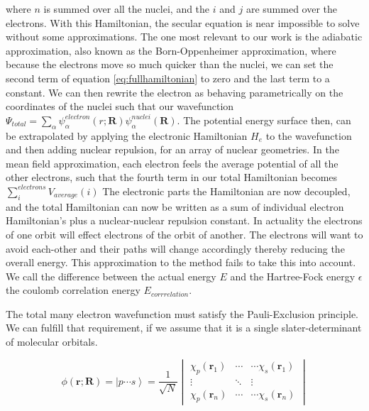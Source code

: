     where $n$ is summed over all the nuclei, and the $i$ and $j$ are summed over the electrons. 
    With this Hamiltonian, the secular equation is near impossible to solve without some approximations.
    The one most relevant to our work is the adiabatic approximation, also known as the Born-Oppenheimer approximation, where because the electrons move so much quicker than the nuclei, we can set the second term of equation \ref{eq:fullhamiltonian} to zero and the last term to a constant. We can then rewrite the electron as behaving parametrically on the coordinates of the nuclei such that our wavefunction $\Psi_{total} = \sum_\alpha\psi_\alpha^{electron}(r;\mathbf{R})\psi_\alpha^{nuclei}(\mathbf{R})$.
    The potential energy surface then, can be extrapolated by applying the electronic Hamiltonian $H_e$ to the wavefunction and then adding nuclear repulsion, for an array of nuclear geometries.
    In the mean field approximation, each electron feels the average potential of all the other electrons, such that the fourth term in our total Hamiltonian becomes $\sum_i^{electrons} V_{average}(i)$
    The electronic parts the Hamiltonian are now decoupled, and the total Hamiltonian can now be written as a sum of individual electron Hamiltonian's plus a nuclear-nuclear repulsion constant.
    In actuality the electrons of one orbit will effect electrons of the orbit of another.
    The electrons will want to avoid each-other and their paths will change accordingly thereby reducing the overall energy.
    This approximation to the method fails to take this into account.
    We call the difference between the actual energy $E$ and the Hartree-Fock energy $\epsilon$ the
    coulomb correlation energy $E_{corrrelation}$.

    The total many electron wavefunction must satisfy the Pauli-Exclusion principle.
    We can fulfill that requirement, if we assume that it is a single slater-determinant of molecular orbitals.

    \begin{equation} \label{eq:slater-determinant} \phi(\bm{r};\bm{R}) =
      \left|p \cdots s\right> = \frac{1}{\sqrt{N}}
      \begin{vmatrix}
	\chi_{p}(\bm{r}_1) & \cdots & \cdots \chi_{s}(\bm{r}_1) \\
	\vdots             & \ddots         &       \vdots      \\
	\chi_{p}(\bm{r}_n) & \cdots & \cdots \chi_{s}(\bm{r}_n)
      \end{vmatrix}
    \end{equation}

